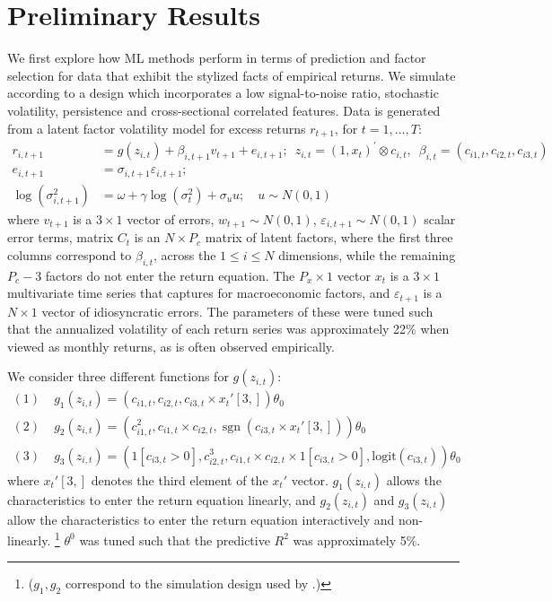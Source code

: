 \documentclass{article}
\begin{document}
\section{Preliminary Results}
We first explore how ML methods perform in terms of prediction and factor selection for data that exhibit the stylized facts of empirical returns. We simulate according to a design which incorporates a low signal-to-noise ratio, stochastic volatility, persistence and cross-sectional correlated features. Data is generated from a latent factor volatility model for excess returns $r_{t+1}$, for $t=1, \dots, T$:
\begin{align*}
r_{i, t+1} &= 
g\left(z_{i, t}\right) + \beta_{i,t+1}v_{t+1} + e_{i, t+1}; 
\enspace z_{i, t} = \left(1, x_{t}\right)^{\prime} \otimes c_{i, t}, 
\enspace \beta_{i, t} = \left(c_{i 1, t}, c_{i 2, t}, c_{i 3, t}\right) \\ 
e_{i, t+1} &= 
\sigma_{i, t+1} \varepsilon_{i, t+1}; \\
\operatorname{log} (\sigma^2_{i,t+1}) &= 
\omega + \gamma \operatorname{log} (\sigma^2_{t}) + \sigma_{u}u;
\quad u \sim N(0, 1)
\end{align*}
where $v_{t+1}$ is a $3\times 1$ vector of errors, $w_{t+1} \sim N(0, 1)$,  $\varepsilon_{i,t+1} \sim N(0, 1)$ scalar error terms, matrix $C_t$ is an $N\times P_c$ matrix of latent factors, where the first three columns correspond to $\beta_{i,t}$, across the $1\leq i\leq N$ dimensions, while the remaining $P_c-3$ factors do not enter the return equation. The $P_x\times1$ vector $x_t$ is a $3 \times 1$ multivariate time series that captures for macroeconomic factors, and $\varepsilon_{t+1}$ is a $N\times 1$ vector of idiosyncratic errors. The parameters of these were tuned such that the annualized volatility of each return series was approximately 22\% when viewed as monthly returns, as is often observed empirically.

We consider three different functions for $g(z_{i, t})$:
\begin{align*}
(1)\; & g_1 \left(z_{i, t}\right)=\left(c_{i 1, t}, c_{i 2, t}, c_{i 3, t} \times x_{t}'[3,]\right) \theta_{0} \\
(2)\; & g_2 \left(z_{i, t}\right)=\left(c_{i 1, t}^{2}, c_{i 1, t} \times c_{i 2, t}, \operatorname{sgn}\left(c_{i 3, t} \times  x_{t}'[3,]\right)\right) \theta_{0} \\
(3)\; & g_3 \left(z_{i, t}\right) = \left(1[c_{i3,t}>0],c_{i 2, t}^{3}, c_{i 1, t} \times c_{i 2, t}\times 1[c_{i3,t}>0], \text{logit}\left({c}_{i3, t} \right)\right) \theta_{0}
\end{align*}
where $x_{t}'[3,]$ denotes the third element of the $x_{t}'$ vector.
$g_1 \left(z_{i, t}\right)$ allows the characteristics to enter the return equation linearly, and $g_2 \left(z_{i, t}\right)$ and $g_3 \left(z_{i, t}\right)$ allow the characteristics to enter the return equation interactively and non-linearly. \footnote{($g_1, g_2$ correspond to the simulation design used by \cite{gu_empirical_2019}.)} $\theta^0$ was tuned such that the predictive $R^2$ was approximately 5\%.
\end{document}

